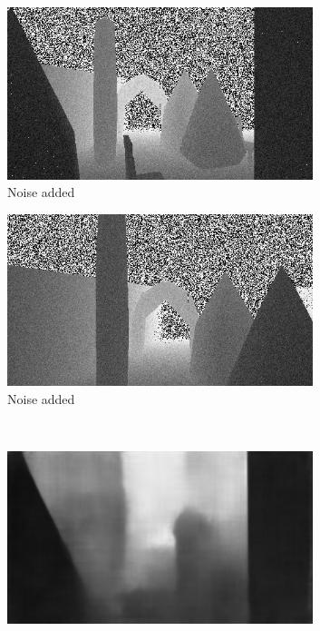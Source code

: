 \begin{figure}[H]
    \begin{subfigure}[b]{0.49\textwidth}
        \centering
        \captionsetup{justification=centering}
        \includegraphics[width=0.98\textwidth]{figures/7_2/11_0_b_post_image.png}
        \caption{Noise added}
        \label{fig:11_0_b_post_image}
    \end{subfigure} 
    \hfill
    \begin{subfigure}[b]{0.49\textwidth}
        \centering
        \captionsetup{justification=centering}
        \includegraphics[width=0.98\textwidth]{figures/7_2/60_0_b_post_image.png}
        \caption{Noise added}
        \label{fig:60_0_b_post_image}
    \end{subfigure} 
    \\
    \begin{subfigure}[b]{0.49\textwidth}
        \centering
        \captionsetup{justification=centering}
        \includegraphics[width=0.98\textwidth]{figures/7_2/11_0_c_vae_image.png}

\end{subfigure}
\end{figure}
